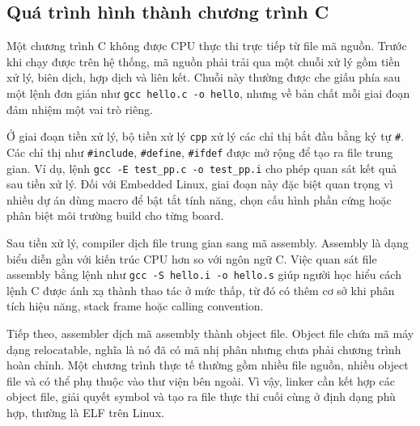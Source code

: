 \documentclass[11pt]{article}
\newcommand{\code}[1]{\texttt{#1}}
\begin{document}
\subsection{Quá trình hình thành chương trình C}

Một chương trình C không được CPU thực thi trực tiếp từ file mã nguồn. Trước khi chạy được trên hệ thống, mã nguồn phải trải qua một chuỗi xử lý gồm tiền xử lý, biên dịch, hợp dịch và liên kết. Chuỗi này thường được che giấu phía sau một lệnh đơn giản như \code{gcc hello.c -o hello}, nhưng về bản chất mỗi giai đoạn đảm nhiệm một vai trò riêng.

Ở giai đoạn tiền xử lý, bộ tiền xử lý \code{cpp} xử lý các chỉ thị bắt đầu bằng ký tự \code{\#}. Các chỉ thị như \code{\#include}, \code{\#define}, \code{\#ifdef} được mở rộng để tạo ra file trung gian. Ví dụ, lệnh \code{gcc -E test\_pp.c -o test\_pp.i} cho phép quan sát kết quả sau tiền xử lý. Đối với Embedded Linux, giai đoạn này đặc biệt quan trọng vì nhiều dự án dùng macro để bật tắt tính năng, chọn cấu hình phần cứng hoặc phân biệt môi trường build cho từng board.

Sau tiền xử lý, compiler dịch file trung gian sang mã assembly. Assembly là dạng biểu diễn gần với kiến trúc CPU hơn so với ngôn ngữ C. Việc quan sát file assembly bằng lệnh như \code{gcc -S hello.i -o hello.s} giúp người học hiểu cách lệnh C được ánh xạ thành thao tác ở mức thấp, từ đó có thêm cơ sở khi phân tích hiệu năng, stack frame hoặc calling convention.

Tiếp theo, assembler dịch mã assembly thành object file. Object file chứa mã máy dạng relocatable, nghĩa là nó đã có mã nhị phân nhưng chưa phải chương trình hoàn chỉnh. Một chương trình thực tế thường gồm nhiều file nguồn, nhiều object file và có thể phụ thuộc vào thư viện bên ngoài. Vì vậy, linker cần kết hợp các object file, giải quyết symbol và tạo ra file thực thi cuối cùng ở định dạng phù hợp, thường là ELF trên Linux.

\begin{center}
\end{center}
\end{document}
